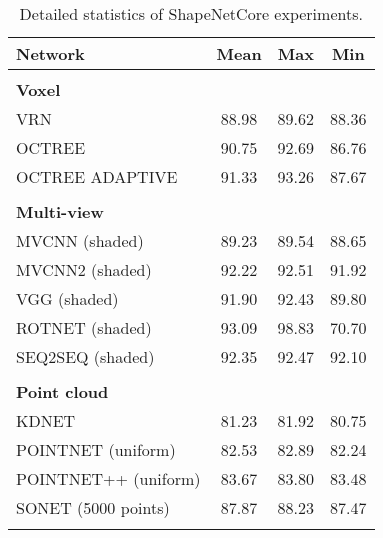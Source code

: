 \begin{table}[!h]
    \centering
	    \begin{tabular}{lccc}
	    	\hline
	    	\textbf{Network}       & \textbf{Mean} & \textbf{Max} & \textbf{Min} \\ \hline
	    	                       &               &              &              \\
	    	\textbf{Voxel }        &               &              &              \\
	    	VRN                    &     88.98     &    89.62     &    88.36     \\
	    	OCTREE                 &     90.75     &    92.69     &    86.76     \\
	    	OCTREE ADAPTIVE        &     91.33     &    93.26     &    87.67     \\ \hline
	    	                       &               &              &              \\
	    	\textbf{Multi-view }   &               &              &              \\
	    	MVCNN (shaded)         &     89.23     &    89.54     &    88.65     \\
	    	MVCNN2 (shaded)        &     92.22     &    92.51     &    91.92     \\
	    	VGG (shaded)           &     91.90     &    92.43     &    89.80     \\
	    	ROTNET (shaded)        &     93.09     &    98.83     &    70.70     \\
	    	SEQ2SEQ (shaded)       &     92.35     &    92.47     &    92.10     \\ \hline
	    	                       &               &              &              \\
	    	\textbf{Point cloud  } &               &              &              \\
	    	KDNET                  &     81.23     &    81.92     &    80.75     \\
	    	POINTNET (uniform)     &     82.53     &    82.89     &    82.24     \\
	    	POINTNET++ (uniform)   &     83.67     &    83.80     &    83.48     \\
	    	SONET (5000 points)    &     87.87     &    88.23     &    87.47     \\ \hline
	    	                       &               &              &
	    \end{tabular}
\caption{Detailed statistics of ShapeNetCore experiments.}
\label{Table:detailss}
\end{table}

